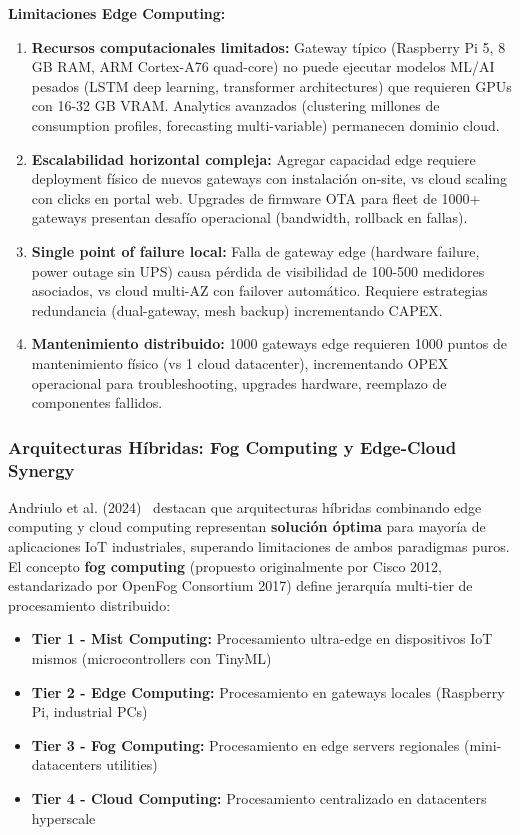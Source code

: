 \textbf{Limitaciones Edge Computing:}

\begin{enumerate}
\item \textbf{Recursos computacionales limitados:} Gateway típico (Raspberry Pi 5, 8 GB RAM, ARM Cortex-A76 quad-core) no puede ejecutar modelos ML/AI pesados (LSTM deep learning, transformer architectures) que requieren GPUs con 16-32 GB VRAM. Analytics avanzados (clustering millones de consumption profiles, forecasting multi-variable) permanecen dominio cloud.

\item \textbf{Escalabilidad horizontal compleja:} Agregar capacidad edge requiere deployment físico de nuevos gateways con instalación on-site, vs cloud scaling con clicks en portal web. Upgrades de firmware OTA para fleet de 1000+ gateways presentan desafío operacional (bandwidth, rollback en fallas).

\item \textbf{Single point of failure local:} Falla de gateway edge (hardware failure, power outage sin UPS) causa pérdida de visibilidad de 100-500 medidores asociados, vs cloud multi-AZ con failover automático. Requiere estrategias redundancia (dual-gateway, mesh backup) incrementando CAPEX.

\item \textbf{Mantenimiento distribuido:} 1000 gateways edge requieren 1000 puntos de mantenimiento físico (vs 1 cloud datacenter), incrementando OPEX operacional para troubleshooting, upgrades hardware, reemplazo de componentes fallidos.
\end{enumerate}

\subsubsection{Arquitecturas Híbridas: Fog Computing y Edge-Cloud Synergy}

Andriulo et al. (2024)~\cite{andriuloEdgeComputingCloud2024} destacan que arquitecturas híbridas combinando edge computing y cloud computing representan \textbf{solución óptima} para mayoría de aplicaciones IoT industriales, superando limitaciones de ambos paradigmas puros. El concepto \textbf{fog computing} (propuesto originalmente por Cisco 2012, estandarizado por OpenFog Consortium 2017) define jerarquía multi-tier de procesamiento distribuido:

\begin{itemize}
\item \textbf{Tier 1 - Mist Computing:} Procesamiento ultra-edge en dispositivos IoT mismos (microcontrollers con TinyML)
\item \textbf{Tier 2 - Edge Computing:} Procesamiento en gateways locales (Raspberry Pi, industrial PCs)
\item \textbf{Tier 3 - Fog Computing:} Procesamiento en edge servers regionales (mini-datacenters utilities)
\item \textbf{Tier 4 - Cloud Computing:} Procesamiento centralizado en datacenters hyperscale
\end{itemize}


